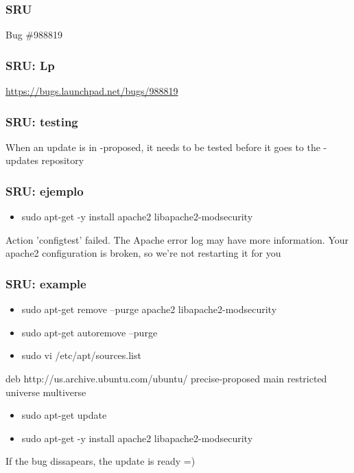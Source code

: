 \documentclass[dvipsnames]{beamer}
\begin{document}
\begin{frame}
  \frametitle{SRU}
  \begin{center}
  \end{center}
  \begin{center}
      Bug \#988819
  \end{center}
\end{frame}

\begin{frame}
  \frametitle{SRU: Lp}
  \begin{center}
  \end{center}
  \begin{center}
      \url{https://bugs.launchpad.net/bugs/988819}
  \end{center}
\end{frame}

\begin{frame}
  \frametitle{SRU: testing}
  \begin{center}
  \end{center}
  \begin{center}
      When an update is in -proposed, it needs to be tested before it goes to the -updates repository
  \end{center}
\end{frame}

\begin{frame}
  \frametitle{SRU: ejemplo}
  \begin{itemize}
  \item sudo apt-get -y install apache2 libapache2-modsecurity
  \end{itemize}
  \begin{center}
    Action 'configtest' failed.
    The Apache error log may have more information.
    Your apache2 configuration is broken, so we're not restarting it for you
  \end{center}
\end{frame}

\begin{frame}
  \frametitle{SRU: example}
  \begin{itemize}
    \item sudo apt-get remove --purge apache2 libapache2-modsecurity
    \item sudo apt-get autoremove --purge
    \item sudo vi /etc/apt/sources.list
  \end{itemize}
    deb http://us.archive.ubuntu.com/ubuntu/ precise-proposed main restricted universe multiverse
  \begin{itemize}
    \item sudo apt-get update
    \item sudo apt-get -y install apache2 libapache2-modsecurity
  \end{itemize}
    If the bug dissapears, the update is ready =)
\end{frame}
\end{document}
